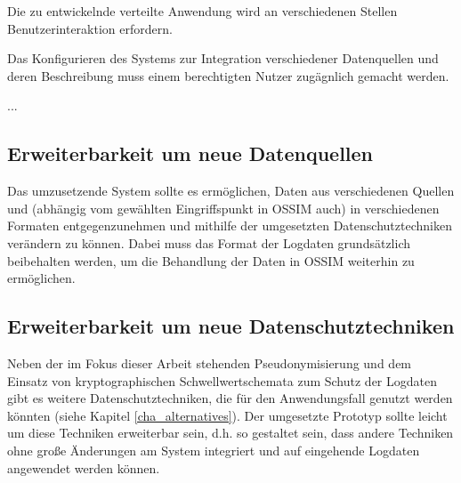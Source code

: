Die zu entwickelnde verteilte Anwendung wird an verschiedenen Stellen Benutzerinteraktion erfordern.

Das Konfigurieren des Systems zur Integration verschiedener Datenquellen und deren Beschreibung muss einem berechtigten Nutzer zugägnlich gemacht werden.

...



\subsection*{Erweiterbarkeit um neue Datenquellen}

Das umzusetzende System sollte es ermöglichen, Daten aus verschiedenen Quellen und (abhängig vom gewählten Eingriffspunkt in OSSIM auch) in verschiedenen Formaten entgegenzunehmen und mithilfe der umgesetzten Datenschutztechniken verändern zu können. Dabei muss das Format der Logdaten grundsätzlich beibehalten werden, um die Behandlung der Daten in OSSIM weiterhin zu ermöglichen.

\subsection*{Erweiterbarkeit um neue Datenschutztechniken}

Neben der im Fokus dieser Arbeit stehenden Pseudonymisierung und dem Einsatz von kryptographischen Schwellwertschemata zum Schutz der Logdaten gibt es weitere Datenschutztechniken, die für den Anwendungsfall genutzt werden könnten (siehe Kapitel \ref{cha_alternatives}). Der umgesetzte Prototyp sollte leicht um diese Techniken erweiterbar sein, d.h. so gestaltet sein, dass andere Techniken ohne große Änderungen am System integriert und auf eingehende Logdaten angewendet werden können.

